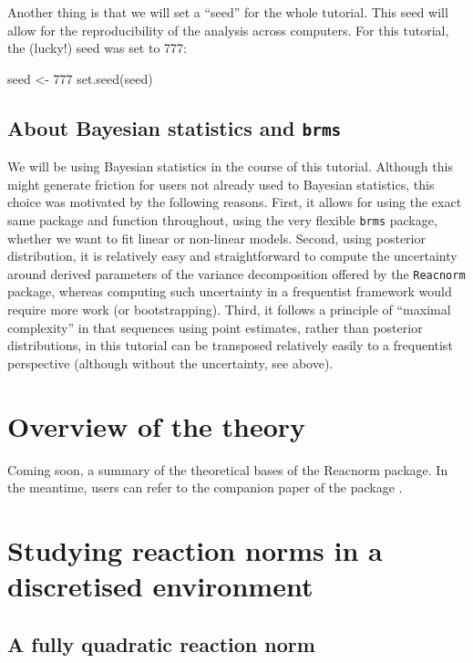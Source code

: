 \documentclass[a4paper,12pt,twoside]{article}
\begin{document}
Another thing is that we will set a ``seed'' for the whole tutorial. This seed will allow for the reproducibility of the analysis across computers.
For this tutorial, the (lucky!) seed was set to 777:
\begin{Rinput}
seed <- 777
set.seed(seed)
\end{Rinput}

\subsection{About Bayesian statistics and \texttt{brms}}
\label{subsec_brms}

We will be using Bayesian statistics in the course of this tutorial. Although this might generate friction for users not already used to Bayesian statistics, this choice was motivated by the following reasons.
First, it allows for using the exact same package and function throughout, using the very flexible \texttt{brms} package, whether we want to fit linear or non-linear models.
Second, using posterior distribution, it is relatively easy and straightforward to compute the uncertainty around derived parameters of the variance decomposition offered by the \texttt{Reacnorm} package, whereas computing such uncertainty in a frequentist framework would require more work (or bootstrapping).
Third, it follows a principle of ``maximal complexity'' in that sequences using point estimates, rather than posterior distributions, in this tutorial can be transposed relatively easily to a frequentist perspective (although without the uncertainty, see above).


\section{Overview of the theory}

Coming soon, a summary of the theoretical bases of the Reacnorm package. In the meantime, users can refer to the companion paper of the package \autocite{devillemereuil_partitioning_2025}.


\section{Studying reaction norms in a discretised environment}

\subsection{A fully quadratic reaction norm}
\end{document}
